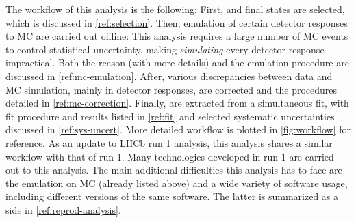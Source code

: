
The workflow of this analysis is the following:
First, \Dstarp\mun and \Dz\mun final states are selected, which is discussed
in \cref{ref:selection}.
Then, emulation of certain detector responses to MC are carried out offline:
This analysis requires a large number of MC events to control statistical
uncertainty, making \emph{simulating} every detector response impractical.
Both the reason (with more details) and the emulation procedure are discussed in
\cref{ref:mc-emulation}.
After, various discrepancies between data and MC simulation,
mainly in detector responses, are corrected and the procedures detailed
in \cref{ref:mc-correction}.
Finally, \RDX are extracted from a simultaneous fit, with fit procedure and
results listed in \cref{ref:fit}
and selected systematic uncertainties discussed in
\cref{ref:sys-uncert}.
More detailed workflow is plotted in \cref{fig:workflow}
for reference.
As an update to LHCb \RDX run 1 analysis, this analysis shares a similar
workflow with that of run 1.
Many technologies developed in run 1 are carried out to this analysis.
The main additional difficulties this analysis has to face are the emulation
on MC (already listed above) and a wide variety of software usage, including
different versions of the same software.
The latter is summarized as a side in \cref{ref:reprod-analysis}.

